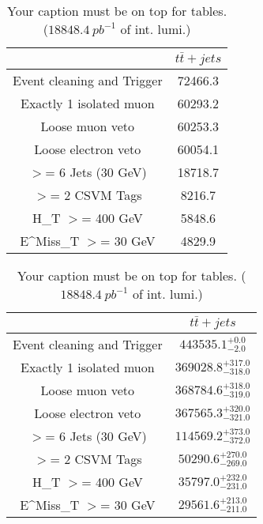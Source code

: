 \documentclass{article}
\begin{document}
\begin{table}
\caption{Your caption must be on top for tables. ($18848.4~pb^{-1}$ of int. lumi.)}
\label{tab:}
\centering
\begin{tabular}{|c|c|}
\toprule
&$t\bar{t}+jets$	\\

\midrule
Event cleaning and Trigger&	72466.3	\\

Exactly 1 isolated muon&	60293.2	\\

Loose muon veto&	60253.3	\\

Loose electron veto&	60054.1	\\

$>$= 6 Jets (30 GeV)&	18718.7	\\

$>$= 2 CSVM Tags&	8216.7	\\

H_{T} $>$=  400 GeV&	5848.6	\\

E^{Miss}_{T} $>$=  30 GeV&	4829.9	\\

\bottomrule
\end{tabular}
\end{table}
\begin{table}
\caption{Your caption must be on top for tables. ($18848.4~pb^{-1}$ of int. lumi.)}
\label{tab:}
\centering
\begin{tabular}{|c|c|}
\toprule
&$t\bar{t}+jets$	\\

\midrule
Event cleaning and Trigger&	$443535.1^{+0.0}_{-2.0}$	\\

Exactly 1 isolated muon&	$369028.8^{+317.0}_{-318.0}$	\\

Loose muon veto&	$368784.6^{+318.0}_{-319.0}$	\\

Loose electron veto&	$367565.3^{+320.0}_{-321.0}$	\\

$>$= 6 Jets (30 GeV)&	$114569.2^{+373.0}_{-372.0}$	\\

$>$= 2 CSVM Tags&	$50290.6^{+270.0}_{-269.0}$	\\

H_{T} $>$=  400 GeV&	$35797.0^{+232.0}_{-231.0}$	\\

E^{Miss}_{T} $>$=  30 GeV&	$29561.6^{+213.0}_{-211.0}$	\\

\bottomrule
\end{tabular}
\end{table}
\end{document}
